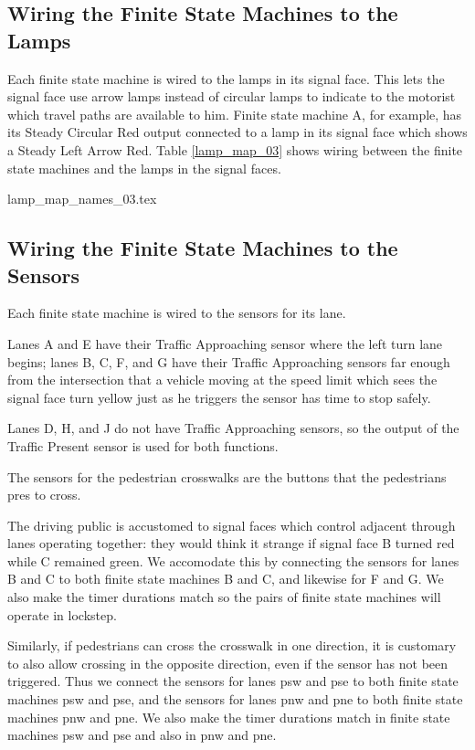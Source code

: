 \documentclass[letterpaper,twoside]{article}
\begin{document}
\subsection{Wiring the Finite State Machines to the Lamps}

Each finite state machine is wired to the lamps in its signal face.
This lets the signal face  use arrow lamps instead of circular lamps
to indicate to the motorist which travel paths are available to him.
Finite state machine A, for example, has its Steady Circular Red output
connected to a lamp in its signal face which shows a Steady Left Arrow Red.
Table \ref{lamp_map_03} shows wiring between the finite state
machines and the lamps in the signal faces.

 {lamp_map_names_03.tex}

\subsection{Wiring the Finite State Machines to the Sensors}

Each finite state machine is wired to the sensors for its lane.

Lanes A and E have their Traffic Approaching sensor where
the left turn lane begins; lanes B, C, F, and G have their
Traffic Approaching sensors far enough from the intersection that a vehicle
moving at the speed limit which sees the signal face turn yellow
just as he triggers the sensor has time to stop safely.

Lanes D, H, and J do not have Traffic Approaching sensors, so the output
of the Traffic Present sensor is used for both functions.

The sensors for the pedestrian crosswalks are the buttons that
the pedestrians pres to cross.

The driving public is accustomed to signal faces which control
adjacent through lanes operating together: they would think it strange
if signal face B turned red while C remained green.  We accomodate this
by connecting the sensors for lanes B and C to both finite state machines
B and C, and likewise for F and G.  We also make the timer durations
match so the pairs of finite state machines will operate in lockstep.

Similarly, if pedestrians can cross the crosswalk in one direction,
it is customary to also allow crossing in the opposite direction,
even if the sensor has not been triggered.  Thus we connect the sensors
for lanes psw and pse to both finite state machines psw and pse,
and the sensors for lanes pnw and pne to both finite state machines
pnw and pne.  We also make the timer durations match in finite state
machines psw and pse and also in pnw and pne.
\end{document}
